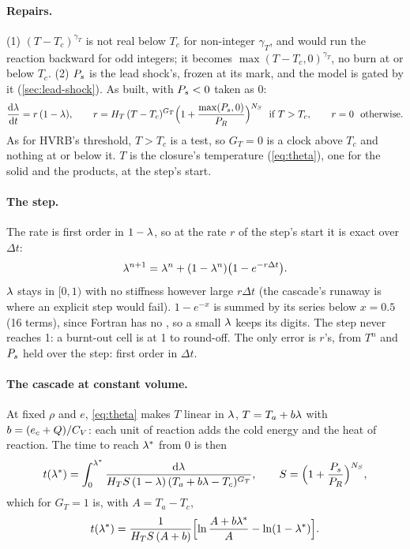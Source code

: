 \paragraph{Repairs.} (1) $(T - T_c)^{\gamma_T}$ is not real below $T_c$ for
non-integer $\gamma_T$, and would run the reaction backward for odd
integers; it becomes $\max(T - T_c, 0)^{\gamma_T}$, no burn at or below
$T_c$. (2) $P_{s}$ is the lead shock's, frozen at its mark, and the model is
gated by it (\cref{sec:lead-shock}). As built, with $P_{s} < 0$ taken as 0:
\begin{equation}
  \frac{\mathrm{d}\lambda}{\mathrm{d} t} = r\,(1 - \lambda), \qquad
  r = H_T\,(T - T_c)^{G_T}\Bigl(1 + \frac{\max(P_{s}, 0)}{P_R}\Bigr)^{N_S}
  \ \text{ if } T > T_c, \qquad r = 0 \ \text{ otherwise}.
  \label{eq:tc-rate}
\end{equation}
As for HVRB's threshold, $T > T_c$ is a test, so $G_T = 0$ is a clock above
$T_c$ and nothing at or below it. $T$ is the closure's temperature
(\cref{eq:theta}), one for the solid and the products, at the step's start.

\paragraph{The step.} The rate is first order in $1 - \lambda$, so at the rate
$r$ of the step's start it is exact over $\Delta t$:
\begin{equation}
  \lambda^{n+1} = \lambda^n + (1 - \lambda^n)\bigl(1 - e^{-r\Delta t}\bigr).
  \label{eq:tc-step}
\end{equation}
$\lambda$ stays in $[0, 1)$ with no stiffness however large $r\Delta t$ (the
cascade's runaway is where an explicit step would fail). $1 - e^{-x}$ is
summed by its series below $x = 0.5$ (16 terms), since Fortran has no
, so a small $\lambda$ keeps its digits. The step never reaches 1:
a burnt-out cell is at 1 to round-off. The only error is $r$'s, from $T^n$
and $P_{s}$ held over the step: first order in $\Delta t$.

\paragraph{The cascade at constant volume.} At fixed $\rho$ and $e$,
\cref{eq:theta} makes $T$ linear in $\lambda$, $T = T_a + b\lambda$ with $b = (e_c +
Q)/C_{V}$: each unit of reaction adds the cold energy and the heat of reaction.
The time to reach $\lambda^\ast$ from 0 is then
\begin{equation}
  t(\lambda^\ast) = \int_0^{\lambda^\ast}
    \frac{\mathrm{d}\lambda}{H_T S\,(1 - \lambda)\,(T_a + b\lambda - T_c)^{G_T}},
  \qquad S = \Bigl(1 + \frac{P_{s}}{P_R}\Bigr)^{N_S},
  \label{eq:tc-cascade}
\end{equation}
which for $G_T = 1$ is, with $A = T_a - T_c$,
\begin{equation}
  t(\lambda^\ast) = \frac{1}{H_T S\,(A + b)}
  \Bigl[\ln\frac{A + b\lambda^\ast}{A} - \ln(1 - \lambda^\ast)\Bigr].
  \label{eq:tc-cascade-gt1}
\end{equation}

